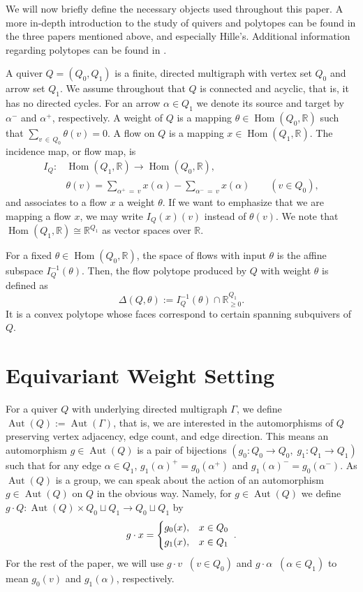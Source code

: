 \documentclass[11pt]{amsart}
\theoremstyle{plain}
\theoremstyle{definition}
\newcommand{\R}{\mathbb{R}}
\DeclareMathOperator{\aut}{Aut}
\DeclareMathOperator{\Hom}{Hom}
\renewcommand{\hom}{\Hom}
\begin{document}
We will now briefly define the necessary objects used throughout this paper. A more in-depth introduction to the study of quivers and polytopes can be found in the three papers mentioned above, and especially Hille's. Additional information regarding polytopes can be found in \cite{10.5555/285869}.

A quiver $Q=(Q_0,Q_1)$ is a finite, directed multigraph with vertex set $Q_0$ and arrow set $Q_1$. We assume throughout that $Q$ is connected and acyclic, that is, it has no directed cycles. For an arrow $\alpha \in Q_1$ we denote its source and target by $\alpha^-$ and $\alpha^+$, respectively. A weight of $Q$ is a mapping $\theta \in \hom(Q_0, \R)$ such that $\sum_{v \,\in\, Q_0} \theta(v) = 0$. A flow on $Q$ is a mapping $x \in \hom(Q_1, \R)$. The incidence map, or flow map, is
\begin{align*}
I_Q : &\hom(Q_1, \R) \longrightarrow \hom(Q_0, \R),\\
&\theta(v) = \sum_{\alpha^+ \,=\,v} x(\alpha) - \sum_{\alpha^-\,=\,v} x(\alpha) \quad \quad (v \in Q_0),
\end{align*}
 and associates to a flow $x$ a weight
 $\theta$. If we want to emphasize that we are mapping a flow $x$, we may write $I_Q(x)(v)$ instead of $\theta(v)$. We note that $\hom(Q_1, \R) \cong \R^{Q_1}$ as vector spaces over $\R$.

For a fixed $\theta \in \hom(Q_0, \R)$, the space of flows with input $\theta$ is the affine subspace $I_Q^{-1}(\theta)$.
Then, the flow polytope produced by $Q$ with weight $\theta$ is defined as
\[
\Delta(Q, \theta) := I_Q^{-1}(\theta) \cap \mathbb{R}_{\ge 0}^{Q_1}.
\]
It is a convex polytope whose faces correspond to certain spanning subquivers of $Q$.

\section{Equivariant Weight Setting}
\noindent For a quiver $Q$ with underlying directed multigraph $\Gamma$, we define $\aut(Q) := \aut(\Gamma)$, that is, we are interested in the automorphisms of $Q$ preserving vertex adjacency, edge count, and edge direction. This means an automorphism $g \in \aut(Q)$ is a pair of bijections $(g_0 : Q_0 \to Q_0, \;g_1 : Q_1 \to Q_1)$ such that for any edge $\alpha \in Q_1$, $g_1(\alpha)^+ = g_0(\alpha^+)$ and $g_1(\alpha)^- = g_0(\alpha^-)$. As $\aut(Q)$ is a group, we can speak about the action of an automorphism $g \in \aut(Q)$ on $Q$ in the obvious way. Namely, for $g \in \aut(Q)$ we define $g \cdot Q : \aut(Q) \times Q_0 \sqcup Q_1 \to Q_0 \sqcup Q_1$ by 
\[
g \cdot x = \begin{dcases}
    g_0(x), &x \in Q_0 \\
    g_1(x), &x \in Q_1
\end{dcases}\;.
\]
For the rest of the paper, we will use $g \cdot v \;\;(v \in Q_0)$ and $g \cdot \alpha \;\; (\alpha \in Q_1)$ to mean $g_0(v)$ and $g_1(\alpha)$, respectively. 
\end{document}

